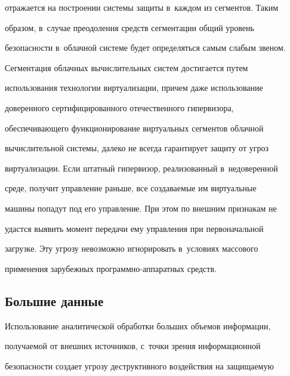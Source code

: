 отражается на построении системы защиты в~каждом из сегментов. Таким 


образом, в~случае преодоления средств сегментации общий уровень 


безопасности в~облачной системе будет определяться самым слабым звеном.


   


   Сегментация облачных вычислительных систем достигается путем 


использования технологии виртуализации, причем даже использование 


доверенного сертифицированного отечественного гипервизора, 


обеспечивающего функционирование виртуальных сегментов облачной 


вычислительной системы, далеко не всегда гарантирует защиту от угроз 


виртуализации. Если штатный гипервизор, реализованный в~недоверенной 


среде, получит управление раньше, все созда\-ва\-емые им виртуальные 


машины попадут под его управление. При этом по внешним признакам не 


удастся выявить момент передачи ему управления при первоначальной 


загрузке. Эту угрозу невозможно игнорировать в~условиях массового 


применения зарубежных программно-аппаратных средств.





\vspace*{-4pt} 





\subsection{Большие данные}





\vspace*{-2pt}





   Использование аналитической обработки больших объемов информации, 


получаемой от внешних источников, с~точки зрения информационной 


безопас\-ности создает угрозу деструктивного воздействия на защищаемую 


